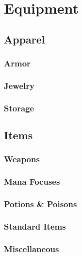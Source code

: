 

\part{Equipment}

\chapter{Apparel}
\section{Armor}
\section{Jewelry}
\section{Storage}

\chapter{Items}
\section{Weapons}
\section{Mana Focuses}
\section{Potions \& Poisons}
\section{Standard Items}
\section{Miscellaneous}


